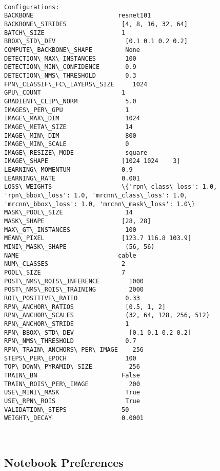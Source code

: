 \documentclass[11pt]{article}
\begin{document}
    \begin{Verbatim}[commandchars=\\\{\}]

Configurations:
BACKBONE                       resnet101
BACKBONE\_STRIDES               [4, 8, 16, 32, 64]
BATCH\_SIZE                     1
BBOX\_STD\_DEV                   [0.1 0.1 0.2 0.2]
COMPUTE\_BACKBONE\_SHAPE         None
DETECTION\_MAX\_INSTANCES        100
DETECTION\_MIN\_CONFIDENCE       0.9
DETECTION\_NMS\_THRESHOLD        0.3
FPN\_CLASSIF\_FC\_LAYERS\_SIZE     1024
GPU\_COUNT                      1
GRADIENT\_CLIP\_NORM             5.0
IMAGES\_PER\_GPU                 1
IMAGE\_MAX\_DIM                  1024
IMAGE\_META\_SIZE                14
IMAGE\_MIN\_DIM                  800
IMAGE\_MIN\_SCALE                0
IMAGE\_RESIZE\_MODE              square
IMAGE\_SHAPE                    [1024 1024    3]
LEARNING\_MOMENTUM              0.9
LEARNING\_RATE                  0.001
LOSS\_WEIGHTS                   \{'rpn\_class\_loss': 1.0, 'rpn\_bbox\_loss': 1.0, 'mrcnn\_class\_loss': 1.0, 'mrcnn\_bbox\_loss': 1.0, 'mrcnn\_mask\_loss': 1.0\}
MASK\_POOL\_SIZE                 14
MASK\_SHAPE                     [28, 28]
MAX\_GT\_INSTANCES               100
MEAN\_PIXEL                     [123.7 116.8 103.9]
MINI\_MASK\_SHAPE                (56, 56)
NAME                           cable
NUM\_CLASSES                    2
POOL\_SIZE                      7
POST\_NMS\_ROIS\_INFERENCE        1000
POST\_NMS\_ROIS\_TRAINING         2000
ROI\_POSITIVE\_RATIO             0.33
RPN\_ANCHOR\_RATIOS              [0.5, 1, 2]
RPN\_ANCHOR\_SCALES              (32, 64, 128, 256, 512)
RPN\_ANCHOR\_STRIDE              1
RPN\_BBOX\_STD\_DEV               [0.1 0.1 0.2 0.2]
RPN\_NMS\_THRESHOLD              0.7
RPN\_TRAIN\_ANCHORS\_PER\_IMAGE    256
STEPS\_PER\_EPOCH                100
TOP\_DOWN\_PYRAMID\_SIZE          256
TRAIN\_BN                       False
TRAIN\_ROIS\_PER\_IMAGE           200
USE\_MINI\_MASK                  True
USE\_RPN\_ROIS                   True
VALIDATION\_STEPS               50
WEIGHT\_DECAY                   0.0001



    \end{Verbatim}

    \subsection{Notebook Preferences}\label{notebook-preferences}
\end{document}
